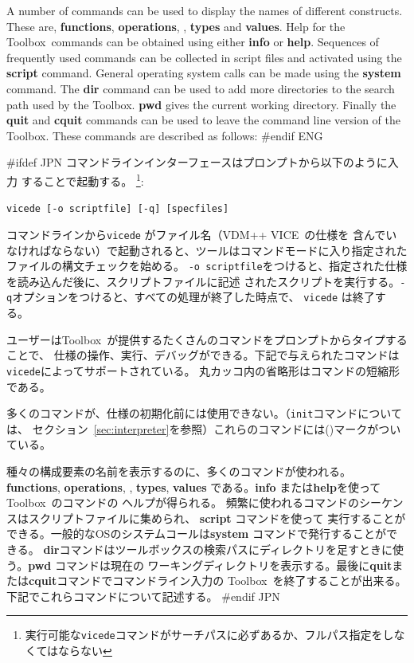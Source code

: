 \documentclass[\pformat,12pt]{article}
\newcommand{\vdmslpp}{VDM-SL}
\newcommand{\Toolbox}{Toolbox}
\newcommand{\vdmde}{vdmde}
\newcommand{\vdmslpp}{VDM++}
\newcommand{\Toolbox}{Toolbox}
\newcommand{\vdmde}{vppde}
\renewcommand{\vdmslpp}{VDM++ VICE}
\renewcommand{\vdmde}{vicede}
\newcommand{\cmd}{\tt }
\begin{document}
A number of commands can be used to display the names of different
constructs. These are,
\textbf{functions}, \textbf{operations},
,
\textbf{types} and \textbf{values}.  Help for the \Toolbox\ commands
can be obtained using either \textbf{info} or \textbf{help}. Sequences
of frequently used commands can be collected in script files and
activated using the \textbf{script} command. General operating system
calls can be made using the \textbf{system} command. The \textbf{dir}
command can be used to add more directories to the search path used by
the \Toolbox. \textbf{pwd} gives the current
working directory. Finally the \textbf{quit} and \textbf{cquit}
commands can be used to leave the command line version of the
\Toolbox.  These commands are described as follows:
#endif ENG

#ifdef JPN
コマンドラインインターフェースはプロンプトから以下のように入力 することで起動する。
\footnote{実行可能な{\tt \vdmde}コマンドがサーチパスに必ずあるか、フルパス指定をしなくてはならない}:

{\tt \vdmde\ [-o scriptfile] [-q] [specfiles]}

コマンドラインから{\tt \vdmde} がファイル名（\vdmslpp\ の仕様を
含んでいなければならない）で起動されると、ツールはコマンドモードに入り指定された
ファイルの構文チェックを始める。
{\tt -o scriptfile}をつけると、指定された仕様を読み込んだ後に、スクリプトファイルに記述
されたスクリプトを実行する。{\tt -q}オプションをつけると、すべての処理が終了した時点で、
{\tt \vdmde} は終了する。

ユーザーは\Toolbox\ が提供するたくさんのコマンドをプロンプトからタイプすることで、
仕様の操作、実行、デバッグができる。下記で与えられたコマンドは{\tt \vdmde}によってサポートされている。
丸カッコ内の省略形はコマンドの短縮形である。

多くのコマンドが、仕様の初期化前には使用できない。（{\cmd init}コマンドについては、
セクション~\ref{sec:interpreter}を参照）これらのコマンドには({\tt *})マークがついている。

種々の構成要素の名前を表示するのに、多くのコマンドが使われる。
\textbf{functions}, \textbf{operations}, 
,
\textbf{types}, \textbf{values}
である。\textbf{info} または\textbf{help}を使って\Toolbox\ のコマンドの
ヘルプが得られる。
頻繁に使われるコマンドのシーケンスはスクリプトファイルに集められ、 \textbf{script} コマンドを使って
実行することができる。一般的なOSのシステムコールは\textbf{system} コマンドで発行することができる。
\textbf{dir}コマンドはツールボックスの検索パスにディレクトリを足すときに使う。\textbf{pwd} コマンドは現在の
ワーキングディレクトリを表示する。最後に\textbf{quit}または\textbf{cquit}コマンドでコマンドライン入力の
\Toolbox\ を終了することが出来る。下記でこれらコマンドについて記述する。
#endif JPN
\end{document}
